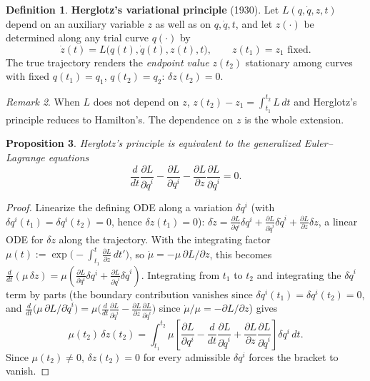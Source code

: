 \documentclass[11pt]{book}
\theoremstyle{definition}
\newtheorem{definition}{Definition}[section]
\theoremstyle{plain}
\newtheorem{proposition}[definition]{Proposition}
\theoremstyle{remark}
\newtheorem{remark}[definition]{Remark}
\begin{document}
\begin{definition}
\textbf{Herglotz's variational principle} (1930). Let $L(q,\dot q,z,t)$ depend on an auxiliary variable $z$ as well as on $q,\dot q,t$, and let $z(\cdot)$ be determined along any trial curve $q(\cdot)$ by
\[
\dot z(t) = L\big(q(t),\dot q(t), z(t), t\big), \qquad z(t_1)=z_1 \text{ fixed}.
\]
The true trajectory renders the \emph{endpoint value} $z(t_2)$ stationary among curves with fixed $q(t_1)=q_1$, $q(t_2)=q_2$: $\delta z(t_2) = 0$.
\end{definition}

\begin{remark}
When $L$ does not depend on $z$, $z(t_2)-z_1=\int_{t_1}^{t_2}L\,dt$ and Herglotz's principle reduces to Hamilton's. The dependence on $z$ is the whole extension.
\end{remark}

\begin{proposition}
Herglotz's principle is equivalent to the generalized Euler--Lagrange equations
\[
\frac{d}{dt}\frac{\partial L}{\partial\dot q^i} - \frac{\partial L}{\partial q^i} - \frac{\partial L}{\partial z}\frac{\partial L}{\partial\dot q^i} = 0 .
\]
\end{proposition}
\begin{proof}
Linearize the defining ODE along a variation $\delta q^i$ (with $\delta q^i(t_1)=\delta q^i(t_2)=0$, hence $\delta z(t_1)=0$): $\delta\dot z = \frac{\partial L}{\partial q^i}\delta q^i+\frac{\partial L}{\partial \dot q^i}\delta\dot q^i+\frac{\partial L}{\partial z}\delta z$, a linear ODE for $\delta z$ along the trajectory. With the integrating factor $\mu(t):=\exp\!\big(-\int_{t_1}^t \frac{\partial L}{\partial z}\,dt'\big)$, so $\dot\mu=-\mu\,\partial L/\partial z$, this becomes $\frac{d}{dt}(\mu\,\delta z) = \mu\left(\frac{\partial L}{\partial q^i}\delta q^i+\frac{\partial L}{\partial\dot q^i}\delta\dot q^i\right)$. Integrating from $t_1$ to $t_2$ and integrating the $\delta\dot q^i$ term by parts (the boundary contribution vanishes since $\delta q^i(t_1)=\delta q^i(t_2)=0$, and $\frac{d}{dt}\big(\mu\,\partial L/\partial\dot q^i\big)=\mu\big(\frac{d}{dt}\frac{\partial L}{\partial\dot q^i}-\frac{\partial L}{\partial z}\frac{\partial L}{\partial\dot q^i}\big)$ since $\dot\mu/\mu=-\partial L/\partial z$) gives
\[
\mu(t_2)\,\delta z(t_2) = \int_{t_1}^{t_2}\mu\left[\frac{\partial L}{\partial q^i}-\frac{d}{dt}\frac{\partial L}{\partial\dot q^i}+\frac{\partial L}{\partial z}\frac{\partial L}{\partial \dot q^i}\right]\delta q^i\,dt .
\]
Since $\mu(t_2)\neq0$, $\delta z(t_2)=0$ for every admissible $\delta q^i$ forces the bracket to vanish.
\end{proof}
\end{document}
